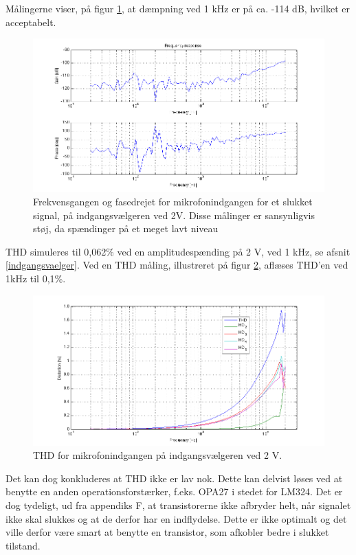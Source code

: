 Målingerne viser, på figur \ref{fig:indaccept:slukketmaaling}, at dæmpning ved 1 kHz er på ca. -114 dB, hvilket er acceptabelt.
\begin{figure}[h]
\centering
\includegraphics[width=\textwidth]{maalerapporter/indgangsvaelger/Indgangsvlger-mic-2v-slukket-frek.png}
\caption{Frekvensgangen og fasedrejet for mikrofonindgangen for et slukket signal, på indgangsvælgeren ved 2V. Disse målinger er sansynligvis støj, da spændinger på et meget lavt niveau}
\label{fig:indaccept:slukketmaaling}
\end{figure}	

THD simuleres til 0,062\% ved en amplitudespænding på 2 V, ved 1 kHz, se afsnit \ref{indgangsvaelger}. Ved en THD måling, illustreret på figur \ref{fig:accind:thd2v}, aflæses THD'en ved 1kHz til 0,1\%. 
\begin{figure}[h]
\centering
\includegraphics[width=\textwidth]{maalerapporter/indgangsvaelger/Indgangsvlger-mic-2v-thd.png}
\caption{THD for mikrofonindgangen på indgangsvælgeren ved 2 V.}
\label{fig:accind:thd2v}
\end{figure}
Det kan dog konkluderes at THD ikke er lav nok. Dette kan delvist løses ved at benytte en anden operationsforstærker, f.eks. OPA27 i stedet for LM324. Det er dog tydeligt, ud fra appendiks F, at transistorerne ikke afbryder helt, når signalet ikke skal slukkes og at de derfor har en indflydelse. Dette er ikke optimalt og det ville derfor være smart at benytte en transistor, som afkobler bedre i slukket tilstand.